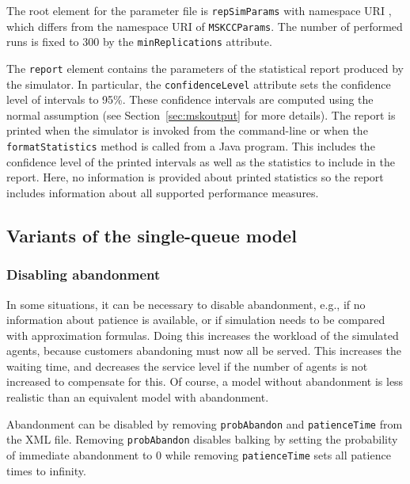

The root element for the parameter file is \texttt{rep\-Sim\-Params} %
with namespace URI
,
which differs from the namespace URI of \texttt{MSKCCParams}.
The number of performed runs is
fixed to 300 by the \texttt{min\-Replications}
attribute.

The \texttt{report} element %
contains the parameters of the statistical report produced by the
simulator.
In particular, the \texttt{confidence\-Level}
attribute sets the confidence
level of intervals to 95\%.
These confidence intervals are computed using the normal
assumption (see Section~\ref{sec:mskoutput}
for more details).
The report is printed when the simulator is invoked from the
command-line or when the \texttt{format\-Statistics} method is called
from a Java program.
This includes the confidence level of the printed intervals as well as
the statistics to include in the report.
Here, no information is provided about printed statistics so
the report includes information about all supported performance
measures.

\subsection{Variants of the single-queue model}

\subsubsection{Disabling abandonment}

In some situations, it can be necessary to disable abandonment, e.g.,
if no information about patience is available, or if simulation needs to
be compared with approximation formulas.
Doing this increases the workload of the simulated agents, because customers
abandoning must now all be served.
This increases the waiting time, and decreases the service level if
the number of agents is not increased to compensate for this.
Of course, a model without abandonment is less realistic than an
equivalent model with abandonment.

Abandonment can be disabled by
removing \texttt{prob\-Abandon} and \texttt{patience\-Time} from the
XML file.
Removing \texttt{prob\-Abandon} disables balking by setting the
probability of immediate abandonment to 0 while
removing \texttt{patience\-Time} sets all patience times to infinity.

